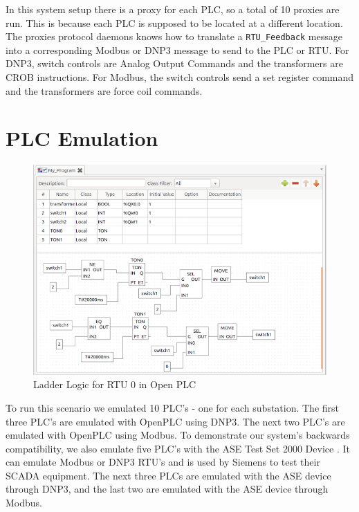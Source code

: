 \documentclass[11pt,a4paper,oldfontcommands]{memoir}
\def\code#1{\texttt{#1}}
\begin{document}
\indent \indent
In this system setup there is a proxy for each PLC, so a total of 10 proxies are run.
This is because each PLC is supposed to be located at a different location. \\

\indent
The proxies protocol daemons knows how to translate a \code{RTU\_Feedback} message
into a corresponding Modbus or DNP3 message to send to the PLC or RTU. For DNP3,
switch controls are Analog Output Commands and the transformers are CROB 
instructions. For Modbus, the switch controls send a set register command and
the transformers are force coil commands. 

\section{PLC Emulation}

\begin{figure}[ht]
  \begin{center}
  \includegraphics{open_plc}
  \caption{Ladder Logic for RTU 0 in Open PLC}
  \label{fig:6}
  \end{center}
\end{figure}

\indent \indent
To run this scenario we emulated 10 PLC's - one for each substation. The first
three PLC's are emulated with OpenPLC using DNP3. The next two PLC's are emulated with
OpenPLC using Modbus. To demonstrate our system's backwards compatibility, we also emulate
five PLC's with the ASE Test Set 2000 Device \cite{ASE Test Set 2000}. It can emulate
Modbus or DNP3 RTU's and is used by Siemens to test their SCADA equipment. The next three
PLCs are emulated with the ASE device through DNP3, and the last two are emulated
with the ASE device through Modbus. \\
\end{document}
